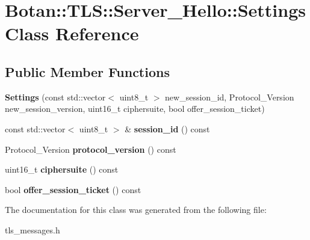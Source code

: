 \hypertarget{class_botan_1_1_t_l_s_1_1_server___hello_1_1_settings}{}\section{Botan\+:\+:T\+LS\+:\+:Server\+\_\+\+Hello\+:\+:Settings Class Reference}
\label{class_botan_1_1_t_l_s_1_1_server___hello_1_1_settings}
\subsection*{Public Member Functions}
\begin{DoxyCompactItemize}
\item 
\mbox{\label{class_botan_1_1_t_l_s_1_1_server___hello_1_1_settings_a88d27c8fb000b70b974191d3de069032}} 
{\bfseries Settings} (const std\+::vector$<$ uint8\+\_\+t $>$ new\+\_\+session\+\_\+id, Protocol\+\_\+\+Version new\+\_\+session\+\_\+version, uint16\+\_\+t ciphersuite, bool offer\+\_\+session\+\_\+ticket)
\item 
\mbox{\label{class_botan_1_1_t_l_s_1_1_server___hello_1_1_settings_a6e9383e62a3a7c666b7dd47eb353c0fa}} 
const std\+::vector$<$ uint8\+\_\+t $>$ \& {\bfseries session\+\_\+id} () const
\item 
\mbox{\label{class_botan_1_1_t_l_s_1_1_server___hello_1_1_settings_a8c7dc8261ad7272ad85a483d3b1cbd35}} 
Protocol\+\_\+\+Version {\bfseries protocol\+\_\+version} () const
\item 
\mbox{\label{class_botan_1_1_t_l_s_1_1_server___hello_1_1_settings_a7955a28969f6c4b278e9851afd63cc06}} 
uint16\+\_\+t {\bfseries ciphersuite} () const
\item 
\mbox{\label{class_botan_1_1_t_l_s_1_1_server___hello_1_1_settings_a8099d95773691d03549e122486206ec2}} 
bool {\bfseries offer\+\_\+session\+\_\+ticket} () const
\end{DoxyCompactItemize}


The documentation for this class was generated from the following file\+:\begin{DoxyCompactItemize}
\item 
tls\+\_\+messages.\+h\end{DoxyCompactItemize}
